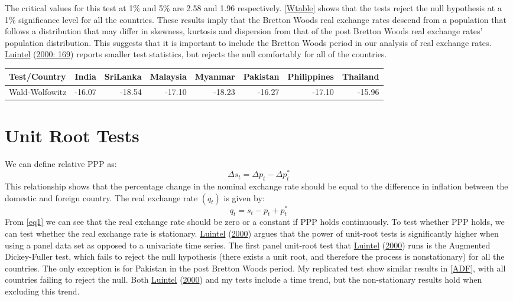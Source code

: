 \documentclass[11pt,preprint, authoryear]{elsarticle}
\let\origtable\table
\let\endorigtable\endtable
\renewenvironment{table}[1][2] {
    \expandafter\origtable\expandafter[H]
} {
    \endorigtable
}
\numberwithin{equation}{section}
\numberwithin{figure}{section}
\numberwithin{table}{section}
\begin{document}
The critical values for this test at 1\% and 5\% are 2.58 and 1.96
respectively. \ref{Wtable} shows that the tests reject the null
hypothesis at a 1\% significance level for all the countries. These
results imply that the Bretton Woods real exchange rates descend from a
population that follows a distribution that may differ in skewness,
kurtosis and dispersion from that of the post Bretton Woods real
exchange rates' population distribution. This suggests that it is
important to include the Bretton Woods period in our analysis of real
exchange rates. \protect\hyperlink{ref-Kul}{Luintel}
(\protect\hyperlink{ref-Kul}{2000: 169}) reports smaller test
statistics, but rejects the null comfortably for all of the countries.

\begin{table}[H]
\centering
\caption{Wald-Wolfowitz tests} 
\label{Wtable}
\begin{tabular}{lrrrrrrr}
  \hline
Test/Country & India & SriLanka & Malaysia & Myanmar & Pakistan & Philippines & Thailand \\ 
  \hline
Wald-Wolfowitz & -16.07 & -18.54 & -17.10 & -18.23 & -16.27 & -17.10 & -15.96 \\ 
   \hline
\end{tabular}
\end{table}

\hypertarget{unit-root-tests}{%
\section{\texorpdfstring{Unit Root Tests
\label{Unit}}{Unit Root Tests }}\label{unit-root-tests}}

We can define relative PPP as: \[
\Delta s_{t}=\Delta p_{t}-\Delta p_{t}^{*} \label{eq1}
\] This relationship shows that the percentage change in the nominal
exchange rate should be equal to the difference in inflation between the
domestic and foreign country. The real exchange rate
\(\left(q_{t}\right)\) is given by: \[
q_{t}=s_{t}-p_{t}+p_{t}^{*} \label{eq2}
\] From \ref{eq1} we can see that the real exchange rate should be zero
or a constant if PPP holds continuously. To test whether PPP holds, we
can test whether the real exchange rate is stationary.
\protect\hyperlink{ref-Kul}{Luintel} (\protect\hyperlink{ref-Kul}{2000})
argues that the power of unit-root tests is significantly higher when
using a panel data set as opposed to a univariate time series. The first
panel unit-root test that \protect\hyperlink{ref-Kul}{Luintel}
(\protect\hyperlink{ref-Kul}{2000}) runs is the Augmented Dickey-Fuller
test, which fails to reject the null hypothesis (there exists a unit
root, and therefore the process is nonstationary) for all the countries.
The only exception is for Pakistan in the post Bretton Woods period. My
replicated test show similar results in \ref{ADF}, with all countries
failing to reject the null. Both \protect\hyperlink{ref-Kul}{Luintel}
(\protect\hyperlink{ref-Kul}{2000}) and my tests include a time trend,
but the non-stationary results hold when excluding this trend.
\end{document}

